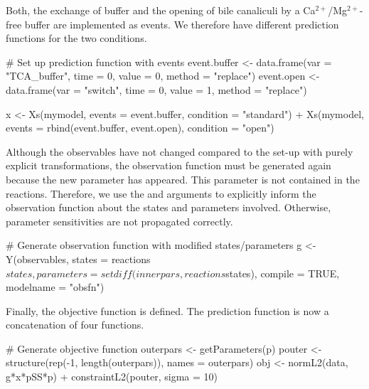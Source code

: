 \documentclass[article]{jss}
\begin{document}
Both, the exchange of buffer and the opening of bile canaliculi by a Ca$^{2+}$/Mg$^{2+}$-free buffer are implemented as events. We therefore have different prediction functions for the two conditions.

\begin{CodeChunk}
\begin{CodeInput}
# Set up prediction function with events
event.buffer <- data.frame(var = "TCA_buffer", 
			   time = 0, 
			   value = 0, 
			   method = "replace")
event.open   <- data.frame(var = "switch", 
			   time = 0, 
			   value = 1, 
			   method = "replace")

x <- Xs(mymodel, 
	events = event.buffer, 
	condition = "standard") +
     Xs(mymodel, 
        events = rbind(event.buffer, event.open), 
	condition = "open")
\end{CodeInput}
\end{CodeChunk}

Although the observables have not changed compared to the set-up with purely explicit transformations, the observation function must be generated again because the new parameter  has appeared. This parameter is not contained in the reactions. Therefore, we use the  and  arguments to explicitly inform the observation function about the states and parameters involved. Otherwise, parameter sensitivities are not propagated correctly.

\begin{CodeChunk}
\begin{CodeInput}
# Generate observation function with modified states/parameters
g <- Y(observables,
       states = reactions$states,
       parameters = setdiff(innerpars, reactions$states),
       compile = TRUE, modelname = "obsfn")
\end{CodeInput}
\end{CodeChunk}

Finally, the objective function is defined. The prediction function is now a concatenation of four functions.

\begin{CodeChunk}
\begin{CodeInput}
# Generate objective function
outerpars <- getParameters(p)
pouter <- structure(rep(-1, length(outerpars)), names = outerpars)
obj <- normL2(data, g*x*pSS*p) + constraintL2(pouter, sigma = 10)
\end{CodeInput}
\end{CodeChunk}
\end{document}

